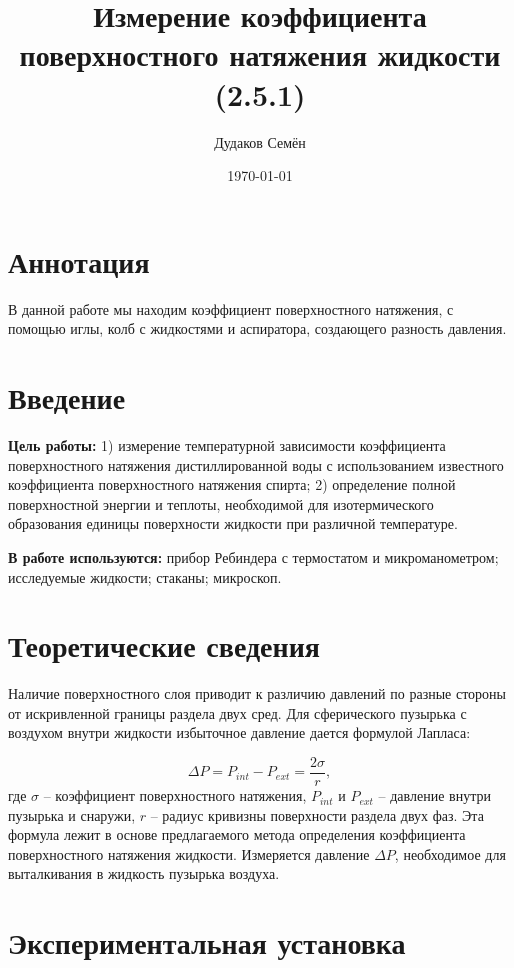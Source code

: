 \documentclass[a4paper,12pt]{article}
\title{Измерение коэффициента поверхностного натяжения жидкости (2.5.1)}
\author{Дудаков Семён}
\date{\today}
\theoremstyle{definition}
\begin{document}
	\maketitle
	\section{Аннотация}
	В данной работе мы находим коэффициент поверхностного натяжения, с помощью иглы, колб с жидкостями и аспиратора, создающего разность давления.
	\section{Введение}
	\noindent\textbf{Цель работы:}
	1) измерение температурной зависимости  коэффициента поверхностного натяжения дистиллированной воды с использованием известного коэффициента поверхностного натяжения спирта; 2) определение полной поверхностной энергии  и теплоты, необходимой для изотермического образования единицы  поверхности жидкости  при различной температуре.
	
	\bigskip
	\noindent\textbf{В работе используются:} прибор  Ребиндера  с термостатом и микроманометром; исследуемые жидкости; стаканы; микроскоп.
	\section{Теоретические сведения}
	
	Наличие поверхностного слоя приводит к различию давлений по разные стороны от искривленной границы раздела двух сред.  Для сферического пузырька с воздухом  внутри жидкости избыточное давление дается формулой Лапласа:
	
	\begin{equation}
		\Delta P = P_{int} - P_{ext} = \frac{2\sigma}{r},
		\label{key}
	\end{equation}
	где $ \sigma $ -- коэффициент поверхностного натяжения, $ P_{int} $ и $ P_{ext} $ -- давление внутри пузырька и снаружи, $ r $ -- радиус кривизны поверхности раздела двух фаз. Эта формула лежит в основе предлагаемого метода определения коэффициента поверхностного натяжения жидкости. Измеряется давление $ \Delta P $, необходимое для выталкивания в жидкость пузырька воздуха.
	
	\section{Экспериментальная установка}
	
\end{document}

